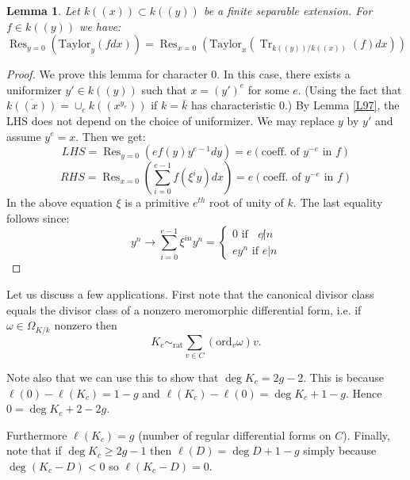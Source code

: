\documentclass{article}
\DeclareMathOperator{\Tr}{Tr}
\DeclareMathOperator{\Res}{Res}
\theoremstyle{plain}
\newtheorem{lem}[thm]{Lemma}
\theoremstyle{definition}
\theoremstyle{remark}
\begin{document}
\begin{lem}
\label{L101}
Let $k((x)) \subset k((y))$ be a finite separable extension. For $f\in k((y))$ we have:
\[  \Res_{y=0}(\text{Taylor}_y(fdx)) = \Res_{x=0}(\text{Taylor}_x(\Tr_{k((y))/k((x))} (f) dx)) \]
\end{lem}
\begin{proof}
We prove this lemma for character 0. In this case, there exists a uniformizer $y' \in k((y))$ such that $x = (y')^e$ for some $e$. (Using the fact that $\overline{k((x))} = \cup_e k((x^{y_e}))$ if $k = \bar k$ has characteristic 0.) By Lemma \ref{L97}, the LHS does not depend on the choice of uniformizer. We may replace $y$ by $y'$ and assume $y^e = x$. Then we get:
\[      LHS = \Res_{y=0} (ef(y) y^{e-1} dy) = e( \text{coeff. of } y^{-e} \text{ in }f)       \]
\[      RHS = \Res_{x=0}(\sum_{i=0}^{e-1} f(\xi^i y) dx) =  e( \text{coeff. of } y^{-e} \text{ in }f)       \]
In the above equation $\xi$ is a primitive $e^{th}$ root of unity of $k$. The last equality follows since:
\[        y^n \to \sum_{i=0}^{e-1} \xi^{in} y^n = \left\{ \begin{array} {c} 0 \text{ if } \;\; e \not | n \\ ey^n \text{ if } e | n \end{array} \right.         \]
\end{proof}

Let us discuss a few applications. First note that the canonical divisor class equals the divisor class of a nonzero meromorphic differential form, i.e. if $\omega\in\Omega_{K/k}$ nonzero then
\[K_c\sim_{\text{rat}}\sum_{v\in C}(\text{ord}_v\omega)v.\]

Note also that we can use this to show that $\deg K_c=2g-2$. This is because $\ell(0)-\ell(K_c)=1-g$ and
$\ell(K_c)-\ell(0)=\deg K_c + 1-g$. Hence $0=\deg K_c+2-2g$.

Furthermore $\ell(K_c)=g$ (number of regular differential forms on $C$). Finally, note that if $\deg K_c\geq 2g-1$ then $\ell(D)=\deg D+1-g$ simply because $\deg(K_c-D)<0$ so $\ell(K_c-D)=0$.
\end{document}
